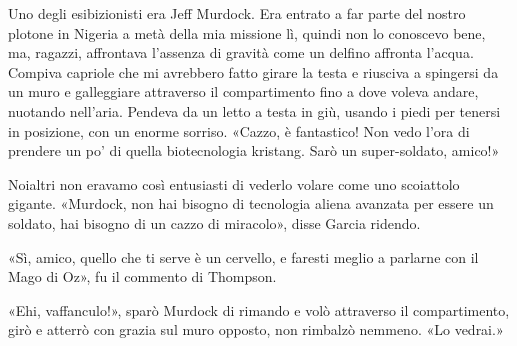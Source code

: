 Uno degli esibizionisti era Jeff Murdock. Era entrato a far parte del
nostro plotone in Nigeria a metà della mia missione lì, quindi non lo
conoscevo bene, ma, ragazzi, affrontava l'assenza di gravità come un
delfino affronta l'acqua. Compiva capriole che mi avrebbero fatto girare
la testa e riusciva a spingersi da un muro e galleggiare attraverso il
compartimento fino a dove voleva andare, nuotando nell'aria. Pendeva da
un letto a testa in giù, usando i piedi per tenersi in posizione, con un
enorme sorriso. «Cazzo, è fantastico! Non vedo l'ora di prendere un po'
di quella biotecnologia kristang. Sarò un super-soldato, amico!»

Noialtri non eravamo così entusiasti di vederlo volare come uno
scoiattolo gigante. «Murdock, non hai bisogno di tecnologia aliena
avanzata per essere un soldato, hai bisogno di un cazzo di miracolo»,
disse Garcia ridendo.

«Sì, amico, quello che ti serve è un cervello, e faresti meglio a
parlarne con il Mago di Oz», fu il commento di Thompson.

«Ehi, vaffanculo!», sparò Murdock di rimando e volò attraverso il
compartimento, girò e atterrò con grazia sul muro opposto, non rimbalzò
nemmeno. «Lo vedrai.»

